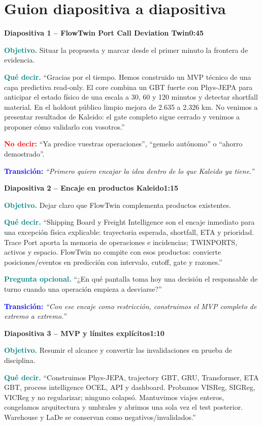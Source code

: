 \documentclass[11pt,a4paper]{article}
\newcommand{\slidehead}[3]{%
  \par\vspace{7pt}\noindent
  \colorbox{Ink}{\parbox{\dimexpr\linewidth-2\fboxsep\relax}{%
    \color{white}\textbf{Diapositiva #1 -- #2}\hfill\color{Teal!45}\textbf{#3}}}%
  \par\vspace{5pt}}
\newcommand{\cue}[1]{\textcolor{Teal}{\textbf{#1}}}
\newcommand{\avoid}[1]{\textcolor{Red}{\textbf{No decir:}} #1}
\newcommand{\transition}[1]{\textcolor{Blue}{\textbf{Transición:}} \emph{``#1''}}
\begin{document}
\clearpage
\section{Guion diapositiva a diapositiva}

\slidehead{1}{FlowTwin Port Call Deviation Twin}{0:45}
\cue{Objetivo.} Situar la propuesta y marcar desde el primer minuto la frontera de evidencia.

\cue{Qué decir.} ``Gracias por el tiempo. Hemos construido un MVP técnico de una capa
predictiva read-only. El core combina un GBT fuerte con Phys-JEPA para anticipar el estado
físico de una escala a 30, 60 y 120 minutos y detectar shortfall material. En el holdout
público limpio mejora de 2.635 a 2.326 km. No venimos a presentar resultados
de Kaleido: el gate completo sigue cerrado y venimos a proponer cómo validarlo con vosotros.''

\avoid{``Ya predice vuestras operaciones'', ``gemelo autónomo'' o ``ahorro demostrado''.}

\transition{Primero quiero encajar la idea dentro de lo que Kaleido ya tiene.}

\slidehead{2}{Encaje en productos Kaleido}{1:15}
\cue{Objetivo.} Dejar claro que FlowTwin complementa productos existentes.

\cue{Qué decir.} ``Shipping Board y Freight Intelligence son el encaje inmediato para una
excepción física explicable: trayectoria esperada, shortfall, ETA y prioridad. Trace Port
aporta la memoria de operaciones e incidencias; TWINPORTS, activos y espacio. FlowTwin no
compite con esos productos: convierte posiciones/eventos en predicción con intervalo,
cutoff, gate y razones.''

\cue{Pregunta opcional.} ``¿En qué pantalla toma hoy una decisión el responsable de turno
cuando una operación empieza a desviarse?''

\transition{Con ese encaje como restricción, construimos el MVP completo de extremo a extremo.}

\slidehead{3}{MVP y límites explícitos}{1:10}
\cue{Objetivo.} Resumir el alcance y convertir las invalidaciones en prueba de disciplina.

\cue{Qué decir.} ``Construimos Phys-JEPA, trajectory GBT, GRU, Transformer, ETA GBT,
process intelligence OCEL, API y dashboard. Probamos VISReg, SIGReg, VICReg y no regularizar;
ninguno colapsó. Mantuvimos viajes enteros, congelamos arquitectura y umbrales y abrimos una
sola vez el test posterior. Warehouse y LaDe se conservan como negativos/invalidados.''
\end{document}
